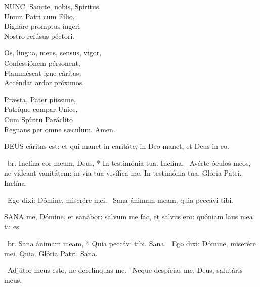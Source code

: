 \lettrine[lines=2]{N}{UNC}, Sancte, nobis, Spíritus,\\
Unum Patri cum Fílio,\\
Dignáre promptus íngeri\\
Nostro refúsus péctori.

Os, lingua, mens, sensus, vigor,\\
Confessiónem pérsonent,\\
Flamméscat igne cáritas,\\
Accéndat ardor próximos.

Præsta, Pater piíssime,\\
Patríque compar Unice,\\
Cum Spíritu Paráclito\\
Regnans per omne sæculum. Amen.





\lettrine[lines=2]{D}{EUS} cáritas est: et qui manet in caritáte, in Deo manet, et Deus in eo.

\R\ br. Inclína cor meum, Deus, * In testimónia tua. Inclína. \V\ Avérte óculos meos, ne vídeant vanitátem: in via tua vivífica me. In testimónia tua. Glória Patri. Inclína.

\V\ Ego dixi: Dómine, miserére mei. \R\ Sana ánimam meam, quia peccávi tibi.




\lettrine[lines=2]{S}{ANA} me, Dómine, et sanábor: salvum me fac, et salvus ero: quóniam laus mea tu es.

\R\ br. Sana ánimam meam, * Quia peccávi tibi. Sana. \V\ Ego dixi: Dómine, miserére mei. Quia. Glória Patri. Sana.

\V\ Adjútor meus esto, ne derelínquas me. \R\ Neque despícias me, Deus, salutáris meus.


